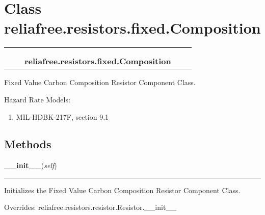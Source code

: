 %
%
%


\section{Class reliafree.resistors.fixed.Composition}

    \label{reliafree:resistors:fixed:Composition}
\begin{tabular}{cccccc}
\multicolumn{2}{r}{\settowidth{\BCL}{reliafree.resistors.resistor.Resistor}\multirow{2}{\BCL}{reliafree.resistors.resistor.Resistor}}
&&
  \\\cline{3-3}
  &&\multicolumn{1}{c|}{}
&&
  \\
&&\multicolumn{2}{l}{\textbf{reliafree.resistors.fixed.Composition}}
\end{tabular}

Fixed Value Carbon Composition Resistor Component Class.

Hazard Rate Models:

\begin{enumerate}

\setlength{\parskip}{0.5ex}
  \item MIL-HDBK-217F, section 9.1

\end{enumerate}



  \subsection{Methods}

    \vspace{0.5ex}

\hspace{.8\funcindent}\begin{boxedminipage}{\funcwidth}

    \raggedright \textbf{\_\_init\_\_}(\textit{self})

    \vspace{-1.5ex}

    \rule{\textwidth}{0.5\fboxrule}
\setlength{\parskip}{2ex}
    Initializes the Fixed Value Carbon Composition Resistor Component 
    Class.

\setlength{\parskip}{1ex}
      Overrides: reliafree.resistors.resistor.Resistor.\_\_init\_\_

    \end{boxedminipage}

